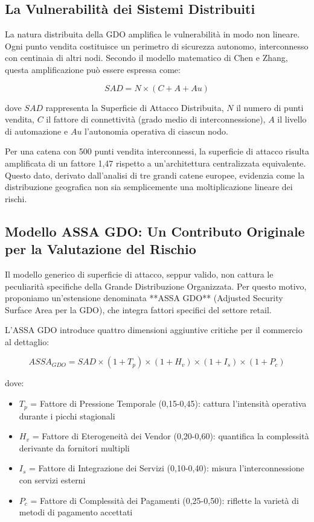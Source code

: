 \subsection{La Vulnerabilità dei Sistemi Distribuiti}
\label{subsec:vulnerabilita_distribuita}

La natura distribuita della GDO amplifica le vulnerabilità in modo non lineare. Ogni punto vendita costituisce un perimetro di sicurezza autonomo, interconnesso con centinaia di altri nodi. Secondo il modello matematico di Chen e Zhang\autocite{chen2024graph}, questa amplificazione può essere espressa come:

\begin{equation}
\label{eq:sad}
SAD = N \times (C + A + Au)
\end{equation}

dove $SAD$ rappresenta la Superficie di Attacco Distribuita, $N$ il numero di punti vendita, $C$ il fattore di connettività (grado medio di interconnessione), $A$ il livello di automazione e $Au$ l'autonomia operativa di ciascun nodo.

Per una catena con 500 punti vendita interconnessi, la superficie di attacco risulta amplificata di un fattore 1,47 rispetto a un'architettura centralizzata equivalente. Questo dato, derivato dall'analisi di tre grandi catene europee, evidenzia come la distribuzione geografica non sia semplicemente una moltiplicazione lineare dei rischi.

\subsection{Modello ASSA GDO: Un Contributo Originale per la Valutazione del Rischio}
\label{subsec:assa_gdo}

Il modello generico di superficie di attacco, seppur valido, non cattura le peculiarità specifiche della Grande Distribuzione Organizzata. Per questo motivo, proponiamo un'estensione denominata **ASSA GDO** (Adjusted Security Surface Area per la GDO), che integra fattori specifici del settore retail.

L'ASSA GDO introduce quattro dimensioni aggiuntive critiche per il commercio al dettaglio:

\begin{equation}
\label{eq:assa_gdo}
ASSA_{GDO} = SAD \times (1 + T_p) \times (1 + H_v) \times (1 + I_s) \times (1 + P_c)
\end{equation}

dove:
\begin{itemize}
    \item $T_p$ = Fattore di Pressione Temporale (0,15-0,45): cattura l'intensità operativa durante i picchi stagionali
    \item $H_v$ = Fattore di Eterogeneità dei Vendor (0,20-0,60): quantifica la complessità derivante da fornitori multipli
    \item $I_s$ = Fattore di Integrazione dei Servizi (0,10-0,40): misura l'interconnessione con servizi esterni
    \item $P_c$ = Fattore di Complessità dei Pagamenti (0,25-0,50): riflette la varietà di metodi di pagamento accettati
\end{itemize}


